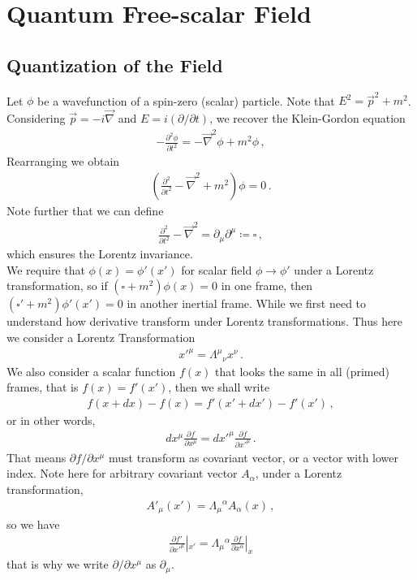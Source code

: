 \documentclass[11pt, onesided]{book}
\theoremstyle{break}
\theoremstyle{break}
\newcommand{\pd}{\partial}
\begin{document}
\chapter{Quantum Free-scalar Field}
\section[Quantization of the Field]{\color{red}Quantization of the Field\color{black}}
Let $\phi$ be a wavefunction of a spin-zero (scalar) particle. Note that $E^2 = \vec{p}^2 + m^2$. Considering $\vec{p} = -i \vec{\nabla}$ and $E = i(\pd/\pd t)$, we recover the Klein-Gordon equation
\begin{align*}
-\frac{\pd^2 \phi}{\pd t^2} = -\vec{\nabla}^2 \phi + m^2 \phi\,,
\end{align*}
Rearranging we obtain
\begin{align}
\left(\frac{\pd^2}{\pd t^2} - \vec{\nabla}^2 +m^2 \right) \phi = 0\,.
\end{align}
Note further that we can define
\begin{align*}
\frac{\pd^2}{\pd t^2} - \vec{\nabla}^2 = \pd_\mu \pd^\mu \coloneqq \square\,,
\end{align*}
which ensures the Lorentz invariance.\\

We require that $\phi(x) = \phi'(x')$ for scalar field $\phi \to \phi'$ under a Lorentz transformation, so if $(\square +m^2) \phi(x) = 0$ in one frame, then $(\square ' + m^2 ) \phi'(x') = 0$ in another inertial frame. While we first need to understand how derivative transform under Lorentz transformations. Thus here we consider a Lorentz Transformation
\begin{align*}
x'^{\mu} = \Lambda^\mu{}_{\nu}x^\nu \,.
\end{align*}
We also consider a scalar function $f(x)$ that looks the same in all (primed) frames, that is $f(x) = f'(x')$, then we shall write
\begin{align*}
f(x + dx) - f(x) = f'(x' + dx') - f'(x')\,,
\end{align*}
or in other words,
\begin{align*}
dx^\mu \frac{\pd f}{\pd x^\mu} = dx'^\mu \frac{\pd f}{\pd x'^\mu}\,.
\end{align*}
That means $\pd f/\pd x^\mu$ must transform as covariant vector, or a vector with lower index. Note here for arbitrary covariant vector $A_\alpha$, under a Lorentz transformation,
\begin{align*}
A'_\mu (x') = \Lambda_\mu{}^\alpha A_\alpha(x)\,,
\end{align*}
so we have
\begin{align*}
\frac{\pd f'}{\pd x'^\mu}|_{x'} = \Lambda_\mu{}^\alpha \frac{\pd f}{\pd x^\alpha}|_x
\end{align*}
that is why we write $\pd/\pd x^\mu$ as $\pd_\mu$. \\
\end{document}

